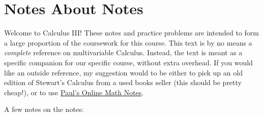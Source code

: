\section*{Notes About Notes}
Welcome to Calculus III! These notes and practice problems are intended to form a large proportion of the coursework for this course. This text is by no means a \textit{complete} reference on multivariable Calculus. Instead, the text is meant as a specific companion for our specific course, without extra overhead. If you would like an outside reference, my suggestion would to be either to pick up an old edition of Stewart's Calculus from a used books seller (this should be pretty cheap!), or to use \href{https://tutorial.math.lamar.edu/Classes/CalcIII/CalcIII.aspx}{Paul's Online Math Notes}.

A few notes on the notes:

